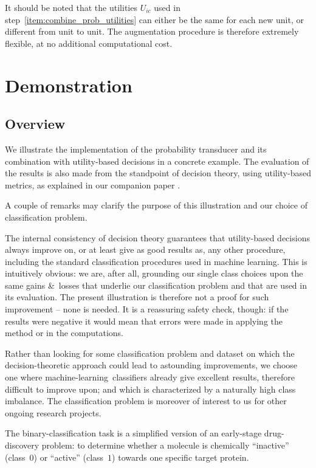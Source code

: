 \documentclass[\ifafour a4paper,12pt,\else a5paper,10pt,\fi%
onecolumn,oneside,article,%
british%
]{memoir}
\theoremstyle{remark}
\theoremstyle{innote}
\newcommand*{\amp}{\&}
\renewcommand*{\|}[1][]{\nonscript\:#1\vert\nonscript\:\mathopen{}}
\newcommand*{\ml}{machine-learning}
\begin{document}
It should be noted that the utilities $U_{ic}$ used in step~\ref{item:combine_prob_utilities} can either be the same for each new unit, or different from unit to unit. The augmentation procedure is therefore extremely flexible, at no additional computational cost.

\section{Demonstration}
\label{sec:demonstration}

\subsection{Overview}
\label{sec:demo_overview}

We illustrate the implementation of the probability transducer and its combination with utility-based decisions in a concrete example. The evaluation of the results is also made from the standpoint of decision theory, using utility-based metrics, as explained in our companion paper \autocites{dyrlandetal2022}.

A couple of remarks may clarify the purpose of this illustration and our choice of classification problem.

The internal consistency of decision theory guarantees that utility-based decisions always improve on, or at least give as good results as, any other procedure, including the standard classification procedures used in machine learning. This is intuitively obvious: we are, after all, grounding our single class choices upon the same gains \amp\ losses that underlie our classification problem and that are used in its evaluation. The present illustration is therefore not a proof for such improvement -- none is needed. It is a reassuring safety check, though: if the results were negative it would mean that errors were made in applying the method or in the computations.

Rather than looking for some classification problem and dataset on which the decision-theoretic approach could lead to astounding improvements, we choose one where \ml\ classifiers already give excellent results, therefore difficult to improve upon; and which is characterized by a naturally high class imbalance. The classification problem is moreover of interest to us for other ongoing research projects.

The binary-classification task is a simplified version of an early-stage drug-discovery problem: to determine whether a molecule is chemically \enquote{inactive} (class~$0$) or \enquote{active} (class~$1$) towards one specific target protein.
\end{document}
